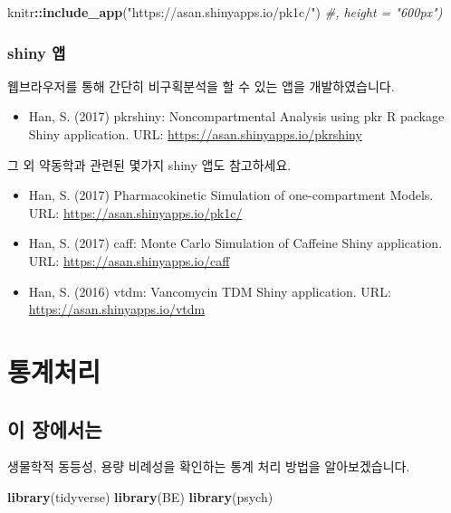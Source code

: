 \documentclass[
  10pt,
]{krantz}
\makeatletter
\newenvironment{Shaded}{\begin{snugshade}}{\end{snugshade}}
\newcommand{\CommentTok}[1]{\textcolor[rgb]{0.56,0.35,0.01}{\textit{#1}}}
\newcommand{\KeywordTok}[1]{\textcolor[rgb]{0.13,0.29,0.53}{\textbf{#1}}}
\newcommand{\NormalTok}[1]{#1}
\newcommand{\OperatorTok}[1]{\textcolor[rgb]{0.81,0.36,0.00}{\textbf{#1}}}
\newcommand{\StringTok}[1]{\textcolor[rgb]{0.31,0.60,0.02}{#1}}
\providecommand{\tightlist}{%
  \setlength{\itemsep}{0pt}\setlength{\parskip}{0pt}}
\newenvironment{kframe}{%
\medskip{}
\setlength{\fboxsep}{.8em}
 \def\at@end@of@kframe{}%
 \ifinner\ifhmode%
  \def\at@end@of@kframe{\end{minipage}}%
  \begin{minipage}{\columnwidth}%
 \fi\fi%
 \def\FrameCommand##1{\hskip\@totalleftmargin \hskip-\fboxsep
 \colorbox{shadecolor}{##1}\hskip-\fboxsep
     \hskip-\linewidth \hskip-\@totalleftmargin \hskip\columnwidth}%
 \MakeFramed {\advance\hsize-\width
   \@totalleftmargin\z@ \linewidth\hsize
   \@setminipage}}%
 {\par\unskip\endMakeFramed%
 \at@end@of@kframe}
\renewenvironment{Shaded}{\begin{kframe}}{\end{kframe}}
\makeatother
\begin{document}
\begin{Shaded}
\begin{Highlighting}[]
\NormalTok{knitr}\OperatorTok{::}\KeywordTok{include\_app}\NormalTok{(}\StringTok{"https://asan.shinyapps.io/pk1c/"}\NormalTok{) }\CommentTok{\#, height = "600px")}
\end{Highlighting}
\end{Shaded}

\hypertarget{shiny}{%
\subsection{shiny 앱}\label{shiny}}

웹브라우저를 통해 간단히 비구획분석을 할 수 있는 앱을 개발하였습니다.

\begin{itemize}
\tightlist
\item
  Han, S. (2017) pkrshiny: Noncompartmental Analysis using pkr R package Shiny application. URL: \url{https://asan.shinyapps.io/pkrshiny}
\end{itemize}

그 외 약동학과 관련된 몇가지 shiny 앱도 참고하세요.

\begin{itemize}
\tightlist
\item
  Han, S. (2017) Pharmacokinetic Simulation of one-compartment Models. URL: \url{https://asan.shinyapps.io/pk1c/}
\item
  Han, S. (2017) caff: Monte Carlo Simulation of Caffeine Shiny application. URL: \url{https://asan.shinyapps.io/caff}
\item
  Han, S. (2016) vtdm: Vancomycin TDM Shiny application. URL: \url{https://asan.shinyapps.io/vtdm}
\end{itemize}

\hypertarget{statistics}{%
\chapter{통계처리}\label{statistics}}

\hypertarget{stat-intro}{%
\section{이 장에서는}\label{stat-intro}}

생물학적 동등성, 용량 비례성을 확인하는 통계 처리 방법을 알아보겠습니다.

\begin{Shaded}
\begin{Highlighting}[]
\KeywordTok{library}\NormalTok{(tidyverse)}
\KeywordTok{library}\NormalTok{(BE)}
\KeywordTok{library}\NormalTok{(psych)}
\end{Highlighting}
\end{Shaded}
\end{document}
